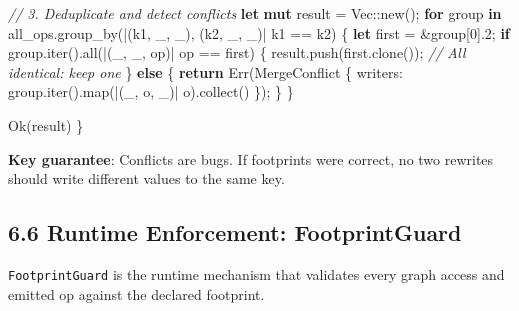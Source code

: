 \documentclass[
  11pt,
]{book}
\newenvironment{Shaded}{}{}
\newcommand{\CommentTok}[1]{\textcolor[rgb]{0.38,0.63,0.69}{\textit{#1}}}
\newcommand{\ConstantTok}[1]{\textcolor[rgb]{0.53,0.00,0.00}{#1}}
\newcommand{\ControlFlowTok}[1]{\textcolor[rgb]{0.00,0.44,0.13}{\textbf{#1}}}
\newcommand{\DataTypeTok}[1]{\textcolor[rgb]{0.56,0.13,0.00}{#1}}
\newcommand{\DecValTok}[1]{\textcolor[rgb]{0.25,0.63,0.44}{#1}}
\newcommand{\KeywordTok}[1]{\textcolor[rgb]{0.00,0.44,0.13}{\textbf{#1}}}
\newcommand{\NormalTok}[1]{#1}
\newcommand{\OperatorTok}[1]{\textcolor[rgb]{0.40,0.40,0.40}{#1}}
\newcommand{\PreprocessorTok}[1]{\textcolor[rgb]{0.74,0.48,0.00}{#1}}
\begin{document}
\begin{Shaded}
\begin{Highlighting}[]
    \CommentTok{// 3. Deduplicate and detect conflicts}
    \KeywordTok{let} \KeywordTok{mut}\NormalTok{ result }\OperatorTok{=} \DataTypeTok{Vec}\PreprocessorTok{::}\NormalTok{new()}\OperatorTok{;}
    \ControlFlowTok{for}\NormalTok{ group }\KeywordTok{in}\NormalTok{ all\_ops}\OperatorTok{.}\NormalTok{group\_by(}\OperatorTok{|}\NormalTok{(k1}\OperatorTok{,}\NormalTok{ \_}\OperatorTok{,}\NormalTok{ \_)}\OperatorTok{,}\NormalTok{ (k2}\OperatorTok{,}\NormalTok{ \_}\OperatorTok{,}\NormalTok{ \_)}\OperatorTok{|}\NormalTok{ k1 }\OperatorTok{==}\NormalTok{ k2) }\OperatorTok{\{}
        \KeywordTok{let}\NormalTok{ first }\OperatorTok{=} \OperatorTok{\&}\NormalTok{group[}\DecValTok{0}\NormalTok{]}\OperatorTok{.}\DecValTok{2}\OperatorTok{;}
        \ControlFlowTok{if}\NormalTok{ group}\OperatorTok{.}\NormalTok{iter()}\OperatorTok{.}\NormalTok{all(}\OperatorTok{|}\NormalTok{(\_}\OperatorTok{,}\NormalTok{ \_}\OperatorTok{,}\NormalTok{ op)}\OperatorTok{|}\NormalTok{ op }\OperatorTok{==}\NormalTok{ first) }\OperatorTok{\{}
\NormalTok{            result}\OperatorTok{.}\NormalTok{push(first}\OperatorTok{.}\NormalTok{clone())}\OperatorTok{;}  \CommentTok{// All identical: keep one}
        \OperatorTok{\}} \ControlFlowTok{else} \OperatorTok{\{}
            \ControlFlowTok{return} \ConstantTok{Err}\NormalTok{(MergeConflict }\OperatorTok{\{}\NormalTok{ writers}\OperatorTok{:}\NormalTok{ group}\OperatorTok{.}\NormalTok{iter()}\OperatorTok{.}\NormalTok{map(}\OperatorTok{|}\NormalTok{(\_}\OperatorTok{,}\NormalTok{ o}\OperatorTok{,}\NormalTok{ \_)}\OperatorTok{|}\NormalTok{ o)}\OperatorTok{.}\NormalTok{collect() }\OperatorTok{\}}\NormalTok{)}\OperatorTok{;}
        \OperatorTok{\}}
    \OperatorTok{\}}

    \ConstantTok{Ok}\NormalTok{(result)}
\OperatorTok{\}}
\end{Highlighting}
\end{Shaded}

\textbf{Key guarantee}: Conflicts are bugs. If footprints were correct,
no two rewrites should write different values to the same key.

\subsection{6.6 Runtime Enforcement:
FootprintGuard}\label{runtime-enforcement-footprintguard}

\texttt{FootprintGuard} is the runtime mechanism that validates every
graph access and emitted op against the declared footprint.
\end{document}
